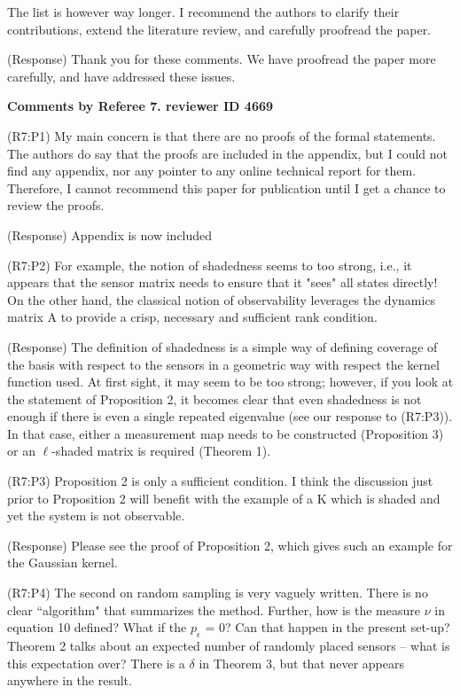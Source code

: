 \documentclass{letter}
\begin{document}
The list is however way longer. I recommend the authors to clarify
their contributions, extend the literature review, and carefully
proofread the paper. 

{\color{red}(Response)} Thank you for these comments. We have proofread the paper more carefully, and have addressed these issues. 

{\bf Comments by Referee 7. reviewer ID 4669}

{\color{red}(R7:P1)} My main concern is that there are no proofs of the formal
statements. The authors do say that the proofs are included in the
appendix, but I could not find any appendix, nor any pointer to any
online technical report for them. Therefore, I cannot recommend this
paper for publication until I get a chance to review the proofs.

{\color{red}(Response)} Appendix is now included

{\color{red}(R7:P2)} For example, the notion of shadedness seems to too strong, i.e., it appears
that the sensor matrix needs to ensure that it "sees" all states
directly! On the other hand, the classical notion of observability
leverages the dynamics matrix A to provide a crisp, necessary and
sufficient rank condition. 

{\color{red}(Response)} The definition of shadedness is a simple way of defining coverage of the basis with respect to the sensors in a geometric way with respect the kernel function used. At first sight, it may seem to be too strong; however, if you look at the statement of Proposition 2, it becomes clear that even shadedness is not enough if there is even a single repeated eigenvalue (see our response to {\color{red}(R7:P3)}). In that case, either a measurement map needs to be constructed (Proposition 3) or an $\ell$-shaded matrix is required (Theorem 1). 


{\color{red}(R7:P3)} Proposition 2 is only a sufficient condition. I think the discussion
just prior to Proposition 2 will benefit with the example of a K which
is shaded and yet the system is not observable. 

{\color{red}(Response)} Please see the proof of Proposition 2, which gives such an example for the Gaussian kernel. 


{\color{red}(R7:P4)} The second on random sampling is very vaguely written. There is no
clear ``algorithm" that summarizes the method. Further, how is the
measure $ \nu $ in equation 10 defined? What if the $ p_\epsilon $ = 0? Can
that happen in the present set-up? Theorem 2 talks about an expected
number of randomly placed sensors -- what is this expectation over? There is a $ \delta $ in Theorem 3, but that never appears anywhere in the result. 
\end{document}
